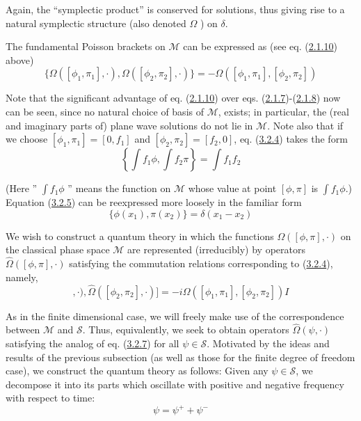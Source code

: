 \documentclass[11pt,a4paper]{article}
\begin{document}
Again, the ``symplectic product'' is conserved for solutions, thus giving rise to a natural symplectic structure (also denoted \(\Omega\) ) on \(\delta\).

The fundamental Poisson brackets on \(\mathcal{M}\) can be expressed as (see eq. (\hyperref[eq:2.1.10]{2.1.10}) above)
\begin{equation*}
\{\Omega([\phi_1, \pi_1], \cdot), \Omega([\phi_2, \pi_2], \cdot)\} = -\Omega([\phi_1, \pi_1], [\phi_2, \pi_2]) \tag{3.2.4}\label{eq:3.2.4}
\end{equation*}

Note that the significant advantage of eq. (\hyperref[eq:2.1.10]{2.1.10}) over eqs. (\hyperref[eq:2.1.7]{2.1.7})-(\hyperref[eq:2.1.8]{2.1.8}) now can be seen, since no natural choice of basis of \(\mathcal{M}\), exists; in particular, the (real and imaginary parts of) plane wave solutions do not lie in \(\mathcal{M}\). Note also that if we choose \([\phi_1, \pi_1] = [0, f_1]\) and \([\phi_2, \pi_2] = [f_2, 0]\), eq. (\hyperref[eq:3.2.4]{3.2.4}) takes the form
\begin{equation*}
\left\{ \int f_1 \phi, \int f_2 \pi \right\} = \int f_1 f_2 \tag{3.2.5}\label{eq:3.2.5}
\end{equation*}

(Here '' \(\int f_1 \phi\) '' means the function on \(\mathcal{M}\) whose value at point \([\phi, \pi]\) is \(\int f_1 \phi\).) Equation (\hyperref[eq:3.2.5]{3.2.5}) can be reexpressed more loosely in the familiar form
\begin{equation*}
\{\phi(x_1), \pi(x_2)\} = \delta(x_1 - x_2) \tag{3.2.6}\label{eq:3.2.6}
\end{equation*}

We wish to construct a quantum theory in which the functions \(\Omega([\phi,\pi],\cdot)\) on the classical phase space \(\mathcal{M}\) are represented (irreducibly) by operators \(\hat{\Omega}([\phi,\pi],\cdot)\) satisfying the commutation relations corresponding to (\hyperref[eq:3.2.4]{3.2.4}), namely,
\begin{equation*}
[\hat{\Omega}([\phi_1, \pi_1], \cdot), \hat{\Omega}([\phi_2, \pi_2], \cdot)] = -i \Omega([\phi_1, \pi_1], [\phi_2, \pi_2]) I \tag{3.2.7}\label{eq:3.2.7}
\end{equation*}

As in the finite dimensional case, we will freely make use of the correspondence between \(\mathcal{M}\) and \(\mathcal{S}\). Thus, equivalently, we seek to obtain operators \(\hat{\Omega}(\psi,\cdot)\) satisfying the analog of eq. (\hyperref[eq:3.2.7]{3.2.7}) for all \(\psi \in \mathcal{S}\). Motivated by the ideas and results of the previous subsection \hypertarget{source-51}{} (as well as those for the finite degree of freedom case), we construct the quantum theory as follows: Given any \(\psi \in \mathcal{S}\), we decompose it into its parts which oscillate with positive and negative frequency with respect to time:
\begin{equation*}
\psi = \psi^+ + \psi^- \tag{3.2.8}\label{eq:3.2.8}
\end{equation*}
\end{document}
